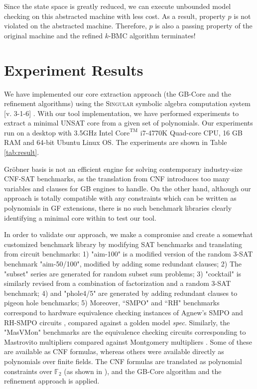 \begin{Example}
Since the state space is greatly
reduced, we can execute unbounded model checking on this  abstracted
machine with less cost. As a result, property $p$ is not violated on
the abstracted machine. Therefore, $p$ is also a passing property of
the original machine and  the refined $k$-BMC algorithm terminates!


\end{Example}

\section{Experiment Results}
\label{sec:exp}


We have implemented our core extraction approach (the GB-Core
and the refinement algorithms) using the \textsc{Singular} symbolic
algebra computation system [v. 3-1-6] \cite{DGPS}. With our
tool implementation, we have performed experiments to extract a
minimal UNSAT core from a given set of  
polynomials. Our experiments run on a desktop with
3.5GHz Intel $\text{Core}^\text{TM}$ i7-4770K Quad-core CPU, 16 GB RAM and
64-bit Ubuntu Linux OS. The experiments are shown in Table \ref{tab:result}. 

Gr\"obner basis is not an efficient engine for solving contemporary
industry-size CNF-SAT benchmarks, as the translation from CNF introduces
too many variables and clauses for GB engines to handle. 
On the other hand, although our approach is totally compatible with 
any constraints which can be written as polynomials in GF extensions,
there is no such benchmark libraries clearly identifying a minimal core within 
to test our tool.

In order to
validate our approach, we make a compromise and create a somewhat customized  benchmark
library by modifying SAT benchmarks and translating from circuit benchmarks: 
1) "aim-100" is a modified version  of the random 3-SAT
benchmark "aim-50/100", modified by adding some redundant clauses; 2)
The "subset" series are generated for random subset sum problems; 3)
"cocktail" is similarly revised from a combination of factorization
and a random 3-SAT benchmark; 4) and "phole4/5" are generated by
adding redundant clauses to pigeon hole benchmarks; 5) Moreover,
``SMPO" and ``RH" benchmarks correspond to hardware equivalence checking
instances of Agnew's SMPO and RH-SMPO
circuits \cite{agnew1991implementation,RHmulti}, compared against a golden model
{\it spec}. Similarly, the "MasVMon" benchmarks are the equivalence
checking  circuits corresponding to Mastrovito multipliers compared
against  Montgomery multipliers \cite{lv:tcad2013}. Some of these are
available as CNF formulas, whereas others were available directly as
polynomials over finite fields. The CNF formulas are translated as
polynomial constraints over $\mathbb{F}_2$ (as shown in
\cite{condrat-tacas07}), and the GB-Core algorithm and the refinement
approach is applied.   

